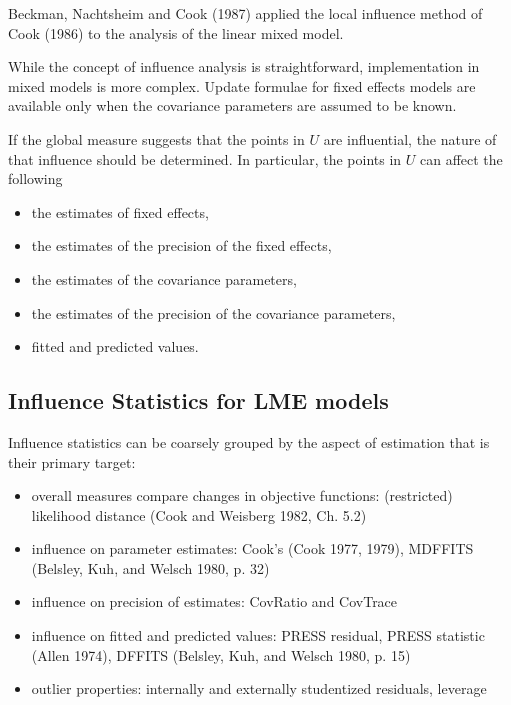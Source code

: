 \documentclass[12pt, a4paper]{article}
\begin{document}
Beckman, Nachtsheim and Cook (1987) \citet{Beckman} applied the local influence method of Cook (1986) to the analysis of the linear mixed model.

While the concept of influence analysis is straightforward, implementation in mixed models is more complex. Update formulae for fixed effects models are available only when the covariance parameters are assumed to be known.

If the global measure suggests that the points in $U$ are influential, the nature of that influence should be determined. In particular, the points in $U$ can affect the following

\begin{itemize}
	\item the estimates of fixed effects,
	\item the estimates of the precision of the fixed effects,
	\item the estimates of the covariance parameters,
	\item the estimates of the precision of the covariance parameters,
	\item fitted and predicted values.
\end{itemize}






\newpage
\subsection{Influence Statistics for LME models} %
Influence statistics can be coarsely grouped by the aspect of estimation that is their primary target:
\begin{itemize}
	\item overall measures compare changes in objective functions: (restricted) likelihood distance (Cook and Weisberg 1982, Ch. 5.2)
	\item influence on parameter estimates: Cook's  (Cook 1977, 1979), MDFFITS (Belsley, Kuh, and Welsch 1980, p. 32)
	\item influence on precision of estimates: CovRatio and CovTrace
	\item influence on fitted and predicted values: PRESS residual, PRESS statistic (Allen 1974), DFFITS (Belsley, Kuh, and Welsch 1980, p. 15)
	\item outlier properties: internally and externally studentized residuals, leverage
\end{itemize}
\end{document}
